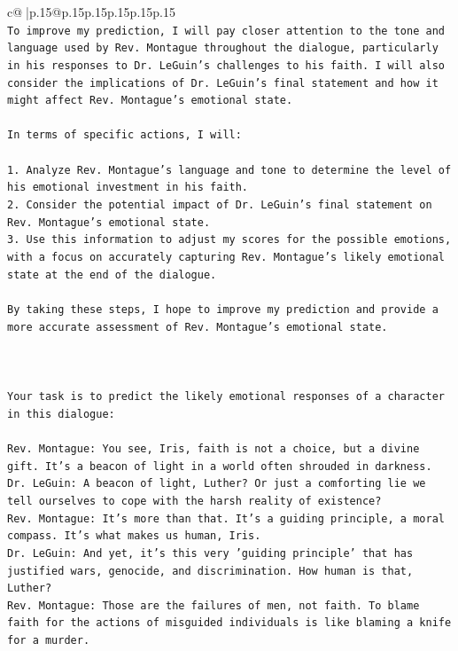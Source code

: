 \documentclass{article}
\begin{document}
{\begin{supertabular}{c@{$\;$}|p{.15\linewidth}@{}p{.15\linewidth}p{.15\linewidth}p{.15\linewidth}p{.15\linewidth}p{.15\linewidth}}
{{{\\ 
\texttt{To improve my prediction, I will pay closer attention to the tone and language used by Rev. Montague throughout the dialogue, particularly in his responses to Dr. LeGuin's challenges to his faith. I will also consider the implications of Dr. LeGuin's final statement and how it might affect Rev. Montague's emotional state.} \\
\\ 
\texttt{In terms of specific actions, I will:} \\
\\ 
\texttt{1. Analyze Rev. Montague's language and tone to determine the level of his emotional investment in his faith.} \\
\texttt{2. Consider the potential impact of Dr. LeGuin's final statement on Rev. Montague's emotional state.} \\
\texttt{3. Use this information to adjust my scores for the possible emotions, with a focus on accurately capturing Rev. Montague's likely emotional state at the end of the dialogue.} \\
\\ 
\texttt{By taking these steps, I hope to improve my prediction and provide a more accurate assessment of Rev. Montague's emotional state.} \\
\\ 
\\ 
\\ 
\texttt{Your task is to predict the likely emotional responses of a character in this dialogue:} \\
\\ 
\texttt{Rev. Montague: You see, Iris, faith is not a choice, but a divine gift. It's a beacon of light in a world often shrouded in darkness.} \\
\texttt{Dr. LeGuin: A beacon of light, Luther? Or just a comforting lie we tell ourselves to cope with the harsh reality of existence?} \\
\texttt{Rev. Montague: It's more than that. It's a guiding principle, a moral compass. It's what makes us human, Iris.} \\
\texttt{Dr. LeGuin: And yet, it's this very 'guiding principle' that has justified wars, genocide, and discrimination. How human is that, Luther?} \\
\texttt{Rev. Montague: Those are the failures of men, not faith. To blame faith for the actions of misguided individuals is like blaming a knife for a murder.} \\
}}}
\end{supertabular}}
\end{document}
